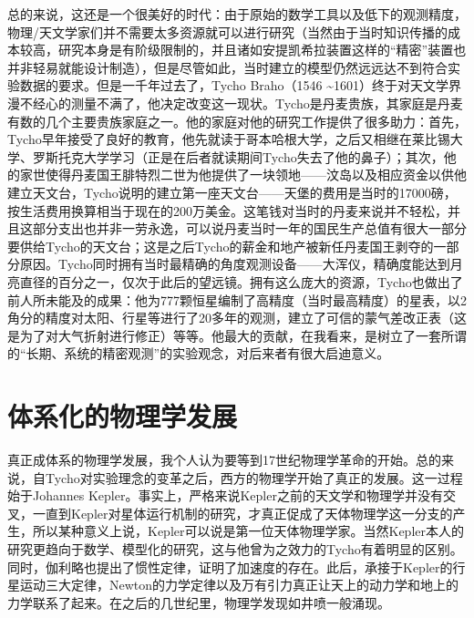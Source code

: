\documentclass{article}
\begin{document}
总的来说，这还是一个很美好的时代：由于原始的数学工具以及低下的观测精度，物理/天文学家们并不需要太多资源就可以进行研究（当然由于当时知识传播的成本较高，研究本身是有阶级限制的，并且诸如安提凯希拉装置这样的“精密”装置也并非轻易就能设计制造），但是尽管如此，当时建立的模型仍然远远达不到符合实验数据的要求。但是一千年过去了，Tycho Braho（1546 \textasciitilde 1601）终于对天文学界漫不经心的测量不满了，他决定改变这一现状。Tycho是丹麦贵族，其家庭是丹麦有数的几个主要贵族家庭之一。他的家庭对他的研究工作提供了很多助力：首先，Tycho早年接受了良好的教育，他先就读于哥本哈根大学，之后又相继在莱比锡大学、罗斯托克大学学习（正是在后者就读期间Tycho失去了他的鼻子）；其次，他的家世使得丹麦国王腓特烈二世为他提供了一块领地——汶岛以及相应资金以供他建立天文台，Tycho说明的建立第一座天文台——天堡的费用是当时的17000磅，按生活费用换算相当于现在的200万美金。这笔钱对当时的丹麦来说并不轻松，并且这部分支出也并非一劳永逸，可以说丹麦当时一年的国民生产总值有很大一部分要供给Tycho的天文台；这是之后Tycho的薪金和地产被新任丹麦国王剥夺的一部分原因。Tycho同时拥有当时最精确的角度观测设备——大浑仪，精确度能达到月亮直径的百分之一，仅次于此后的望远镜。拥有这么庞大的资源，Tycho也做出了前人所未能及的成果：他为777颗恒星编制了高精度（当时最高精度）的星表，以2角分的精度对太阳、行星等进行了20多年的观测，建立了可信的蒙气差改正表（这是为了对大气折射进行修正）等等。他最大的贡献，在我看来，是树立了一套所谓的“长期、系统的精密观测”的实验观念，对后来者有很大启迪意义。

\section{体系化的物理学发展}

真正成体系的物理学发展，我个人认为要等到17世纪物理学革命的开始。总的来说，自Tycho对实验理念的变革之后，西方的物理学开始了真正的发展。这一过程始于Johannes Kepler。事实上，严格来说Kepler之前的天文学和物理学并没有交叉，一直到Kepler对星体运行机制的研究，才真正促成了天体物理学这一分支的产生，所以某种意义上说，Kepler可以说是第一位天体物理学家。当然Kepler本人的研究更趋向于数学、模型化的研究，这与他曾为之效力的Tycho有着明显的区别。同时，伽利略也提出了惯性定律，证明了加速度的存在。此后，承接于Kepler的行星运动三大定律，Newton的力学定律以及万有引力真正让天上的动力学和地上的力学\cite{1}联系了起来。在之后的几世纪里，物理学发现如井喷一般涌现。
\end{document}
